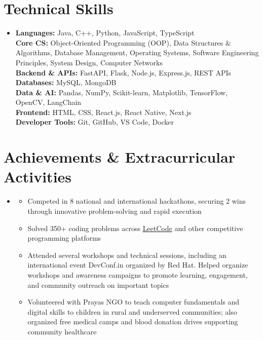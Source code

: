 \documentclass[letterpaper,11pt]{article}
\newcommand{\resumeItem}[1]{
    \item\small{#1}
}
\newcommand{\resumeSubHeadingListStart}{
    \begin{itemize}[
        leftmargin=0.15in,
        label={},
        topsep=1pt,
        partopsep=0pt,
        parsep=0pt,
        itemsep=2pt
    ]
}
\newcommand{\resumeSubHeadingListEnd}{
    \end{itemize}
}
\newcommand{\resumeItemListStart}{
    \begin{itemize}[
        leftmargin=0.18in,
        topsep=1pt,
        partopsep=0pt,
        parsep=0pt,
        itemsep=0.5pt
    ]
}
\newcommand{\resumeItemListEnd}{
    \end{itemize}
}
\begin{document}
\section{Technical Skills}

\resumeSubHeadingListStart
    \item
    \small{
        \textbf{Languages:} Java, C++, Python, JavaScript, TypeScript \\
        \textbf{Core CS:} Object-Oriented Programming (OOP), Data Structures \& Algorithms, Database Management, Operating Systems, Software Engineering Principles, System Design, Computer Networks \\
        \textbf{Backend \& APIs:} FastAPI, Flask, Node.js, Express.js, REST APIs \\
        \textbf{Databases:} MySQL, MongoDB \\
        \textbf{Data \& AI:} Pandas, NumPy, Scikit-learn, Matplotlib, TensorFlow, OpenCV, LangChain \\
        \textbf{Frontend:} HTML, CSS, React.js, React Native, Next.js \\
        \textbf{Developer Tools:} Git, GitHub, VS Code, Docker
    }
\resumeSubHeadingListEnd

\section{Achievements \& Extracurricular Activities}

\resumeSubHeadingListStart

    \item
    \resumeItemListStart
        \resumeItem{Competed in 8 national and international hackathons, securing 2 wins through innovative problem-solving and rapid execution}
        \resumeItem{Solved 350+ coding problems across \href{https://leetcode.com/u/saadziaatharkhan/}{\underline{LeetCode}} and other competitive programming platforms}
        \resumeItem{Attended several workshops and technical sessions, including an international event DevConf.in organized by Red Hat. Helped organize workshops and awareness campaigns to promote learning, engagement, and community outreach on important topics}
        \resumeItem{Volunteered with Prayas NGO to teach computer fundamentals and digital skills to children in rural and underserved communities; also organized free medical camps and blood donation drives supporting community healthcare}
    \resumeItemListEnd

\resumeSubHeadingListEnd


\end{document}
